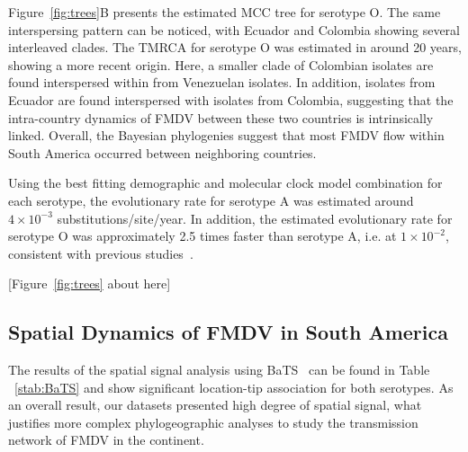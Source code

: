 \documentclass[10pt]{article}
\begin{document}
Figure~\ref{fig:trees}B presents the estimated MCC tree for serotype O.
The same interspersing pattern can be noticed, with Ecuador and Colombia showing several interleaved clades.
The TMRCA for serotype O was estimated in around 20 years, showing a more recent origin.
Here, a smaller clade of Colombian isolates are found interspersed within from Venezuelan isolates. In addition, isolates from Ecuador are found interspersed with isolates from Colombia, suggesting that the intra-country dynamics of FMDV between these two countries is intrinsically linked.
Overall, the Bayesian phylogenies suggest that most FMDV flow within South America occurred between neighboring countries. 

Using the best fitting demographic and molecular clock model combination for each serotype, the evolutionary rate for serotype A was estimated around $4 \times 10^{-3}$ substitutions/site/year.
In addition, the estimated evolutionary rate for serotype O was approximately 2.5 times faster than serotype A, i.e. at $1 \times 10^{-2}$, consistent with previous studies~\cite{tully,Carvalho2013,Muellner2011}. 
\begin{center}
 [Figure~\ref{fig:trees} about here]
\end{center}

\subsection*{Spatial Dynamics of FMDV in South America}

The results of the spatial signal analysis using BaTS~\cite{bats} can be found in Table ~\ref{stab:BaTS} and show significant location-tip association for both serotypes.
As an overall result, our datasets presented high degree of spatial signal, what justifies more complex phylogeographic analyses to study the transmission network of FMDV in the continent.
\end{document}
